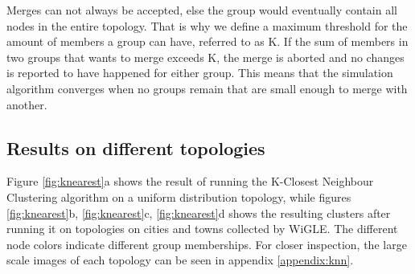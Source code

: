 Merges can not always be accepted, else the group would eventually contain all nodes in the entire topology. That is why we define a maximum threshold for the amount of members a group can have, 
referred to as K. If the sum of members in two groups that wants to merge exceeds K, the merge is aborted and no changes is reported to have happened for either group. 
This means that the simulation algorithm converges when no groups remain that are small enough to merge with another.
 
\subsection{Results on different topologies}
Figure \ref{fig:knearest}a shows the result of running the K-Closest Neighbour Clustering algorithm on a uniform distribution topology, while figures \ref{fig:knearest}b, \ref{fig:knearest}c, \ref{fig:knearest}d shows the resulting clusters after running it on topologies on cities and towns collected by WiGLE. The different node colors indicate different group memberships. For closer inspection,
the large scale images of each topology can be seen in appendix \ref{appendix:knn}.
